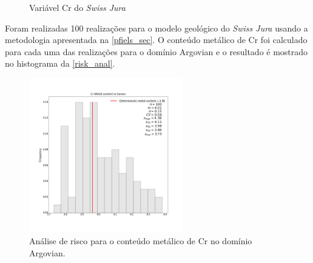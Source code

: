\begin{figure}[H]
    \caption{Variável Cr do \textit{Swiss Jura}} \label{jura_cr}
     \centering
     \hspace{1em}
\end{figure}

Foram realizadas 100 realizações para o modelo geológico do \textit{Swiss Jura} usando a metodologia apresentada na \autoref{pfiels_sec}. O conteúdo metálico de Cr foi calculado para cada uma das realizações para o domínio Argovian e o resultado é mostrado no histograma da \autoref{risk_anal}.

\begin{figure}[H]
\caption{Análise de risco para o conteúdo metálico de Cr no domínio Argovian.}
\label{risk_anal}
\centering
\includegraphics[width=0.6\textwidth]{capitulo_4/imagens/metal_content.png}
\end{figure}

